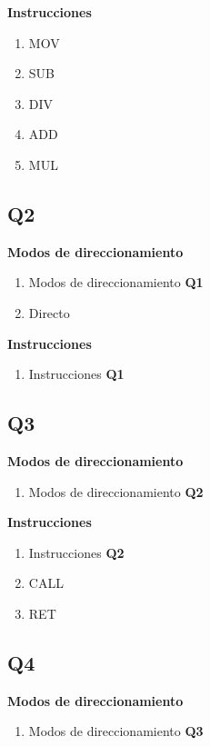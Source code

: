 \textbf{Instrucciones}
\begin{enumerate}
\item MOV
\item SUB 
\item DIV 
\item ADD 
\item MUL
\end{enumerate}


\subsection{Q2}

\textbf{Modos de direccionamiento}
\begin{enumerate}
\item Modos de direccionamiento \textbf{Q1}
\item Directo 
\end{enumerate}

\textbf{Instrucciones}
\begin{enumerate}
\item Instrucciones \textbf{Q1}
\end{enumerate}

\subsection{Q3}

\textbf{Modos de direccionamiento}
\begin{enumerate}
\item Modos de direccionamiento \textbf{Q2}
\end{enumerate}

\textbf{Instrucciones}
\begin{enumerate}
\item Instrucciones \textbf{Q2}
\item CALL
\item RET
\end{enumerate}

\subsection{Q4}

\textbf{Modos de direccionamiento}
\begin{enumerate}
\item Modos de direccionamiento \textbf{Q3}
\end{enumerate}

